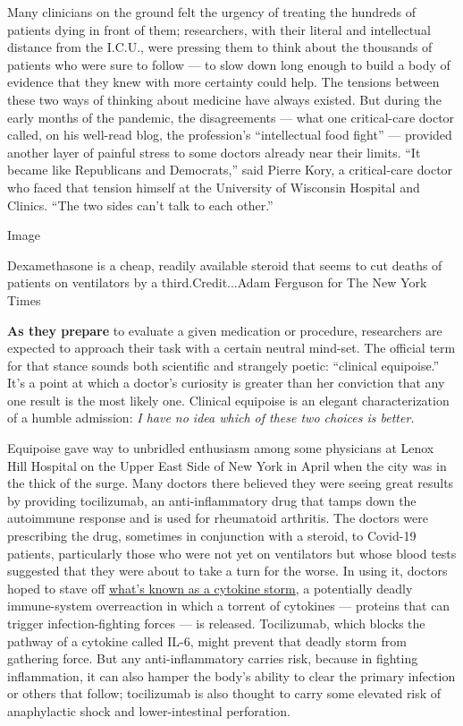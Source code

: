 Many clinicians on the ground felt the urgency of treating the hundreds
of patients dying in front of them; researchers, with their literal and
intellectual distance from the I.C.U., were pressing them to think about
the thousands of patients who were sure to follow --- to slow down long
enough to build a body of evidence that they knew with more certainty
could help. The tensions between these two ways of thinking about
medicine have always existed. But during the early months of the
pandemic, the disagreements --- what one critical-care doctor called, on
his well-read blog, the profession's ``intellectual food fight'' ---
provided another layer of painful stress to some doctors already near
their limits. ``It became like Republicans and Democrats,'' said Pierre
Kory, a critical-care doctor who faced that tension himself at the
University of Wisconsin Hospital and Clinics. ``The two sides can't talk
to each other.''

Image

Dexamethasone is a cheap, readily available steroid that seems to cut
deaths of patients on ventilators by a third.Credit...Adam Ferguson for
The New York Times

\textbf{As they prepare} to evaluate a given medication or procedure,
researchers are expected to approach their task with a certain neutral
mind-set. The official term for that stance sounds both scientific and
strangely poetic: ``clinical equipoise.'' It's a point at which a
doctor's curiosity is greater than her conviction that any one result is
the most likely one. Clinical equipoise is an elegant characterization
of a humble admission: \emph{I have no idea which of these two choices
is better.}

Equipoise gave way to unbridled enthusiasm among some physicians at
Lenox Hill Hospital on the Upper East Side of New York in April when the
city was in the thick of the surge. Many doctors there believed they
were seeing great results by providing tocilizumab, an anti-inflammatory
drug that tamps down the autoimmune response and is used for rheumatoid
arthritis. The doctors were prescribing the drug, sometimes in
conjunction with a steroid, to Covid-19 patients, particularly those who
were not yet on ventilators but whose blood tests suggested that they
were about to take a turn for the worse. In using it, doctors hoped to
stave off
\href{https://www.nytimes.com/2020/04/01/health/coronavirus-cytokine-storm-immune-system.html}{what's
known as a cytokine storm}, a potentially deadly immune-system
overreaction in which a torrent of cytokines --- proteins that can
trigger infection-fighting forces --- is released. Tocilizumab, which
blocks the pathway of a cytokine called IL-6, might prevent that deadly
storm from gathering force. But any anti-inflammatory carries risk,
because in fighting inflammation, it can also hamper the body's ability
to clear the primary infection or others that follow; tocilizumab is
also thought to carry some elevated risk of anaphylactic shock and
lower-intestinal perforation.

